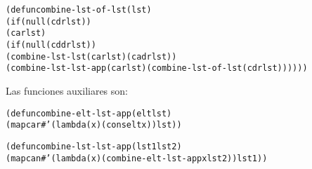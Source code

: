 \begin{aibox}{\code}

\begin{alltt}

(defun combine-lst-of-lst (lst)
    (if (null (cdr lst))
        (car lst)
    (if (null (cddr lst))
            (combine-lst-lst (car lst) (cadr lst))
    (combine-lst-lst-app (car lst) (combine-lst-of-lst (cdr lst))))))

\end{alltt}
Las funciones auxiliares son:
\begin{alltt} 
(defun combine-elt-lst-app (elt lst)
     (mapcar #'(lambda (x) (cons elt x)) lst))

(defun combine-lst-lst-app (lst1 lst2)
     (mapcan #'(lambda (x) (combine-elt-lst-app x lst2)) lst1))
\end{alltt}
\end{aibox}
